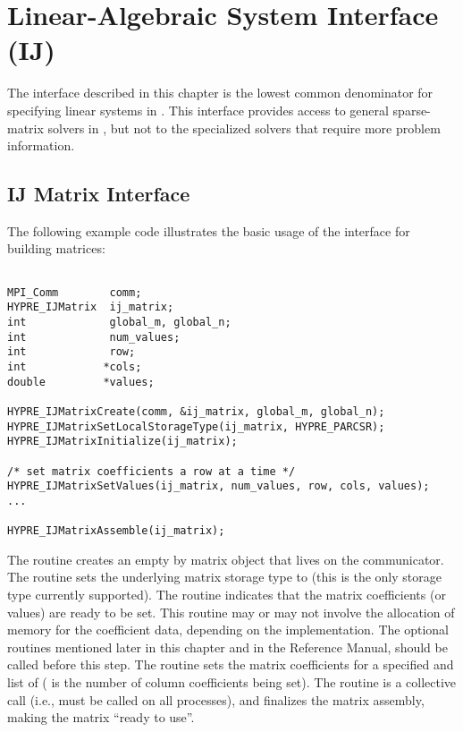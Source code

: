 \chapter{Linear-Algebraic System Interface (IJ)}
\label{Linear-Algebraic System Interface}

The  interface described in this chapter is the lowest common
denominator for specifying linear systems in \hypre{}.  This interface
provides access to general sparse-matrix solvers in \hypre{}, but not
to the specialized solvers that require more problem information.


\section{IJ Matrix Interface}

The following example code illustrates the basic usage of the
 interface for building matrices:
\begin{display}
\begin{verbatim}

MPI_Comm        comm;
HYPRE_IJMatrix  ij_matrix;
int             global_m, global_n;
int             num_values;
int             row;
int            *cols;
double         *values;

HYPRE_IJMatrixCreate(comm, &ij_matrix, global_m, global_n);
HYPRE_IJMatrixSetLocalStorageType(ij_matrix, HYPRE_PARCSR);
HYPRE_IJMatrixInitialize(ij_matrix);

/* set matrix coefficients a row at a time */
HYPRE_IJMatrixSetValues(ij_matrix, num_values, row, cols, values);
...

HYPRE_IJMatrixAssemble(ij_matrix);

\end{verbatim}
\end{display}
The  routine creates an empty  by
 matrix object that lives on the  communicator.
The  routine sets the underlying matrix
storage type to  (this is the only storage type
currently supported).  The  routine indicates that
the matrix coefficients (or values) are ready to be set.  This routine
may or may not involve the allocation of memory for the coefficient
data, depending on the implementation.  The optional 
routines mentioned later in this chapter and in the Reference Manual,
should be called before this step.  The  routine
sets the matrix coefficients for a specified  and list of
 ( is the number of column coefficients being set).
The  routine is a collective call (i.e., must be
called on all processes), and finalizes the matrix assembly, making
the matrix ``ready to use''.


